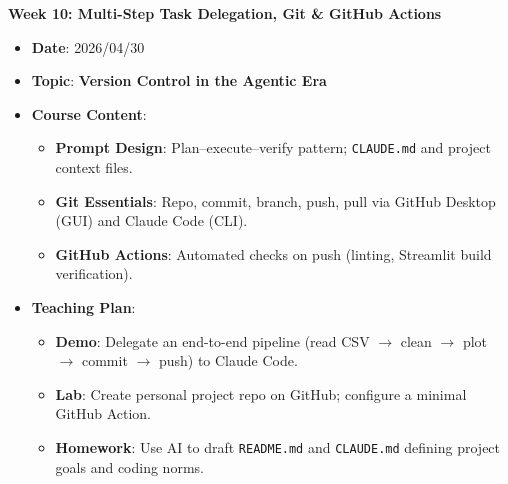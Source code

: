 \noindent\textbf{Week 10: Multi-Step Task Delegation, Git \& GitHub Actions}
\begin{itemize}
    \item \textbf{Date}: 2026/04/30
    \item \textbf{Topic}: \textbf{Version Control in the Agentic Era}
    \item \textbf{Course Content}:
    \begin{itemize}
        \item \textbf{Prompt Design}: Plan--execute--verify pattern; \texttt{CLAUDE.md} and project context files.
        \item \textbf{Git Essentials}: Repo, commit, branch, push, pull via GitHub Desktop (GUI) and Claude Code (CLI).
        \item \textbf{GitHub Actions}: Automated checks on push (linting, Streamlit build verification).
    \end{itemize}
    \item \textbf{Teaching Plan}:
    \begin{itemize}
        \item \textbf{Demo}: Delegate an end-to-end pipeline (read CSV $\rightarrow$ clean $\rightarrow$ plot $\rightarrow$ commit $\rightarrow$ push) to Claude Code.
        \item \textbf{Lab}: Create personal project repo on GitHub; configure a minimal GitHub Action.
        \item \textbf{Homework}: Use AI to draft \texttt{README.md} and \texttt{CLAUDE.md} defining project goals and coding norms.
    \end{itemize}
\end{itemize}

